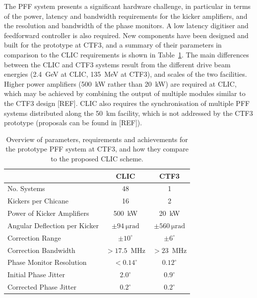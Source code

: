 \documentclass[%
 reprint,
superscriptaddress,
 amsmath,amssymb,
 prl,
]{revtex4-1}
\begin{document}
The PFF system presents a significant hardware challenge, in particular in 
terms of the power, latency and bandwidth requirements for the kicker 
amplifiers, and the resolution and bandwidth of the phase monitors. A low 
latency digitiser and feedforward controller is also required. New 
components have been designed and built for the prototype at CTF3, and a 
summary of their parameters in comparison to the CLIC requirements is shown in 
Table~\ref{tab:pffspecs}. 
The main differences between the CLIC and CTF3 systems result from the 
different drive beam energies (2.4~GeV at CLIC, 135~MeV at CTF3), and scales of 
the two facilities. Higher power amplifiers (500~kW rather than 20~kW) are 
required at CLIC, which may be achieved by combining the output of multiple 
modules similar to the CTF3 design [REF]. CLIC also requires the 
synchronisation of multiple PFF systems distributed along the 50~km facility, 
which is not addressed by the CTF3 prototype (proposals can be found in [REF]).

\begin{table}
	\caption{\label{tab:pffspecs}
	    Overview of parameters, requirements and achievements for the prototype 
	    PFF system at CTF3, and how they compare to the proposed CLIC scheme.}
\begin{ruledtabular}
	\begin{tabular}{lcc}
		 & CLIC & CTF3 \\
		\hline
		No. Systems & 48 & 1 \\
		Kickers per Chicane & 16 & 2 \\
		Power of Kicker Amplifiers & 500~kW & 20~kW \\
		Angular Deflection per Kicker & \(\pm94~\mathrm{\mu rad}\) & 
		\(\pm560~\mathrm{\mu rad}\) \\
		Correction Range & \(\pm 10^\circ\) & \(\pm 6^\circ\) \\
		Correction Bandwidth & \(>17.5\)~MHz & \(>23\)~MHz \\
		Phase Monitor Resolution & \(< 0.14^\circ\) & \(0.12^\circ\)  \\
		Initial Phase Jitter & \(2.0^\circ\) & \(0.9^\circ\) \\
		Corrected Phase Jitter & \(0.2^\circ\) & \(0.2^\circ\) \\
	\end{tabular}
\end{ruledtabular}
\end{table}
\end{document}
